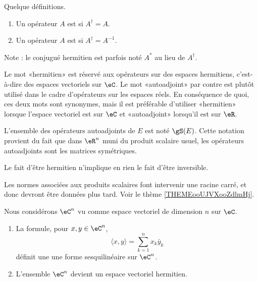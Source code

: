 \begin{definition}      \label{DEFooKEBHooWwCKRK}
	Quelque définitions.
	\begin{enumerate}
		\item
		      Un opérateur \( A\) est  si \( A^{\dag}=A\).
		\item
		      Un opérateur \( A\) est  si \( A^{\dag}=A^{-1}\).
	\end{enumerate}
	Note : le conjugué hermitien est parfois noté \( A^*\) au lieu de \( A^{\dag}\).
\end{definition}

\begin{normaltext}
	Le mot «hermitien» est réservé aux opérateurs sur des espaces hermitiens, c'est-à-dire des espaces vectoriels sur \( \eC\). Le mot «autoadjoint» par contre est plutôt utilisé dans le cadre d'opérateurs sur les espaces réels. En conséquence de quoi, ces deux mots sont synonymes, mais il est préférable d'utiliser «hermitien» lorsque l'espace vectoriel est sur \( \eC\) et «autoadjoint» lorsqu'il est sur \( \eR\).

	L'ensemble des opérateurs autoadjoints de \( E\) est noté \( \gS(E)\). Cette notation provient du fait que dans \( \eR^n\) muni du produit scalaire usuel, les opérateurs autoadjoints sont les matrices symétriques.
\end{normaltext}

\begin{remark}
	Le fait d'être hermitien n'implique en rien le fait d'être inversible.
\end{remark}

\begin{normaltext}
	Les normes associées aux produits scalaires font intervenir une racine carré, et donc devront être données plus tard. Voir le thème \ref{THEMEooUJVXooZdlmHj}.
\end{normaltext}

\begin{proposition}      \label{PROPooMWUCooMbJuaJ}
	Nous considérons \(\eC^n\) vu comme espace vectoriel de dimension \( n\) sur \( \eC\).
	\begin{enumerate}
		\item
		      La formule, pour \( x,y\in \eC^n\),
		      \begin{equation}    \label{EqFormSesqQrjyPH}
			      \langle x, y\rangle =\sum_{k=1}^nx_k\bar y_k
		      \end{equation}
		      définit une une forme sesquilinéaire sur \( \eC^n\).
		\item
		      L'ensemble \( \eC^n\) devient un espace vectoriel hermitien.
	\end{enumerate}
\end{proposition}

